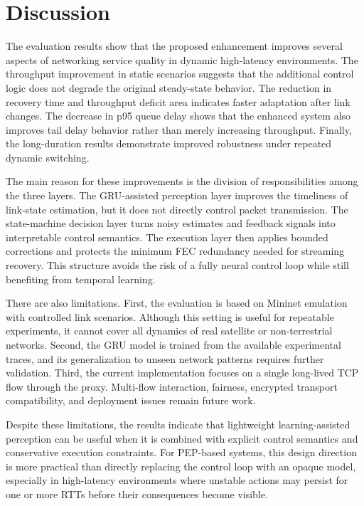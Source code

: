 \section{Discussion}
\label{sec:discussion}

The evaluation results show that the proposed enhancement improves several aspects of networking service quality in dynamic high-latency environments. The throughput improvement in static scenarios suggests that the additional control logic does not degrade the original steady-state behavior. The reduction in recovery time and throughput deficit area indicates faster adaptation after link changes. The decrease in p95 queue delay shows that the enhanced system also improves tail delay behavior rather than merely increasing throughput. Finally, the long-duration results demonstrate improved robustness under repeated dynamic switching.

The main reason for these improvements is the division of responsibilities among the three layers. The GRU-assisted perception layer improves the timeliness of link-state estimation, but it does not directly control packet transmission. The state-machine decision layer turns noisy estimates and feedback signals into interpretable control semantics. The execution layer then applies bounded corrections and protects the minimum FEC redundancy needed for streaming recovery. This structure avoids the risk of a fully neural control loop while still benefiting from temporal learning.

There are also limitations. First, the evaluation is based on Mininet emulation with controlled link scenarios. Although this setting is useful for repeatable experiments, it cannot cover all dynamics of real satellite or non-terrestrial networks. Second, the GRU model is trained from the available experimental traces, and its generalization to unseen network patterns requires further validation. Third, the current implementation focuses on a single long-lived TCP flow through the proxy. Multi-flow interaction, fairness, encrypted transport compatibility, and deployment issues remain future work.

Despite these limitations, the results indicate that lightweight learning-assisted perception can be useful when it is combined with explicit control semantics and conservative execution constraints. For PEP-based systems, this design direction is more practical than directly replacing the control loop with an opaque model, especially in high-latency environments where unstable actions may persist for one or more RTTs before their consequences become visible.
